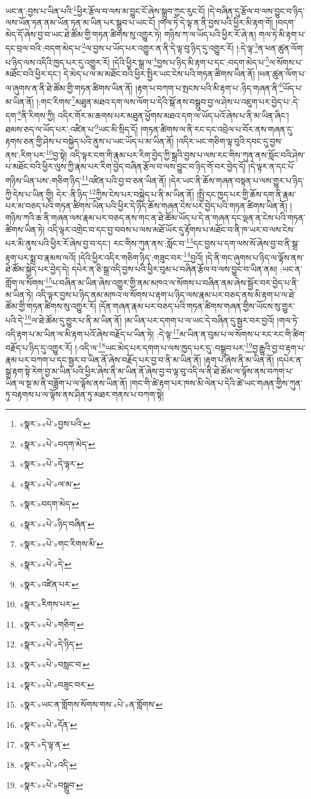 ཡང་ན་:བྱས་པ་ཡིན་པའི་\footnote{«སྣར་»«པེ་»བྱས་པའི་}ཕྱིར་རྩོལ་བ་ལས་མ་བྱུང་ངོ་ཞེས་སྒྲུབ་ཀྱང་རུང་ངོ། །དེ་བཞིན་དུ་རྩོལ་བ་ལས་བྱུང་བ་ཉིད་ལས་ཡོན་ཏན་ནམ་ཡོན་ཏན་མ་ཡིན་པར་སྒྲུབ་པ་ཡང་ངོ། །གལ་ཏེ་དེ་ལྟ་ན་ནི་བྱས་པའི་ཕྱིར་མི་རྟག་གོ། །བདག་མེད་དོ་ཞེས་བྱ་བ་ཡང་ཐེ་ཚོམ་གྱི་གཏན་ཚིགས་སུ་འགྱུར་ཏེ། གཉིས་ཀ་ལ་ཡོད་པའི་ཕྱིར་རོ་ཞེ་ན། གལ་ཏེ་མི་རྟག་པ་དང་བྲལ་བའི་:བདག་མེད་པ་\footnote{«སྣར་»«པེ་»བདག་མེད་}ལ་བྱས་པ་ཡོད་པར་འགྱུར་ན་ནི་དེ་ལྟ་བུ་ཉིད་དུ་འགྱུར་རོ། །:དེ་ལྟ་\footnote{«སྣར་»«པེ་»དེ་ལྟར་}ན་ཕན་ཚུན་ལོག་པ་ཉིད་ལས་འདིའི་ཁྱད་པར་དུ་འགྱུར་རོ། །དེའི་ཕྱིར་སྒྲ་ལ་\footnote{«སྣར་»«པེ་»ལ་མ་}བྱས་པ་ཉིད་མི་རྟག་པ་དང་:བདག་མེད་པ་\footnote{«སྣར་»བདག་མེད་}ལ་སོགས་པ་མཐོང་བའི་ཕྱིར་དང་། དེ་མེད་པ་ལ་མ་མཐོང་བའི་ཕྱིར་སྤྱིར་ཡང་ངེས་པའི་གཏན་ཚིགས་ཡིན་ནོ། །ཕན་ཚུན་ལོག་པ་ལ་ཞུགས་ན་ནི་ཐེ་ཚོམ་གྱི་གཏན་ཚིགས་ཡིན་ནོ། །རྟག་པ་བཀག་པ་སྤངས་པའི་མི་རྟག་པ་:ཉིད་གཞན་ནི་\footnote{«སྣར་»«པེ་»ཉིད་བཞིན་}ཡོད་པ་མ་ཡིན་ནོ། །:གང་རིགས་\footnote{«སྣར་»«པེ་»གང་རིགས་མི་}མཐུན་མཐའ་དག་ལས་ལོག་པ་དེའི་སྒོ་ནས་བསྒྲུབ་བྱ་ལ་ཤེས་པ་འཇུག་པར་བྱེད་པ་:དེ་དག་\footnote{«སྣར་»«པེ་»དེ་}ནི་རིགས་ཀྱི། འདིར་གོར་མ་ཆགས་པར་མཐུན་ཕྱོགས་མཐའ་དག་ལ་ཡོད་པའོ་ཞེས་པ་ནི་མ་ཡིན་ཞིང་། ཐམས་ཅད་ལ་ཡོད་པར་:འཛིན་པ་\footnote{«སྣར་»འཛིན་པར་}ཡང་མི་སྲིད་དོ། །གཏན་ཚིགས་ལ་ནི་རང་དང་འབྲེལ་པ་བོར་ནས་གཞན་དུ་རྟགས་ཅན་གྱི་ཤེས་པ་བསྐྱེད་པའི་ནུས་པ་ཡང་ཡོད་པ་མ་ཡིན་ནོ། །འདིར་ཡང་གཅིག་ལྟ་བུའི་དབང་དུ་བྱས་ནས་:རིག་པར་\footnote{«སྣར་»རིགས་པར་}བྱ་སྟེ། འདི་ལྟར་ངག་གི་རྣམ་པར་རིག་བྱེད་ཀྱི་སྒྲའི་བྱས་པ་ལས་རང་གིས་ཀུན་ནས་སློང་བའི་ཤེས་པ་མཐོང་བའི་ཕྱིར་ལུས་ཀྱི་རྣམ་པར་རིག་བྱེད་བཞིན་རྩོལ་བ་ལས་བྱུང་བ་ཉིད་གོ་བར་བྱེད་དོ། །དེ་ལྟར་ན་དང་པོ་གཉིས་ཡིན་པས་:གཅིག་ཉིད་\footnote{«སྣར་»«པེ་»གཅིག་}འཛིན་པའི་བྱ་བ་ཅན་ཡིན་ནོ། །དེར་ཡང་ནི་ཆོས་གཞན་བསྟན་པ་ལས་གྱུར་པ་ཉིད་ཀྱི་དེས་པ་ཡིན་གྱི། དེར་:ནི་ཉིད་\footnote{«སྣར་»«པེ་»དེ་ཉིད་}ཀྱིས་ངེས་པར་བསྐྱེད་པ་ནི་མ་ཡིན་ནོ། །སྤྱི་དང་ཁྱད་པར་གྱི་ཆོས་དག་ནི་རྣམ་པར་མ་བཅད་པའི་གཏན་ཚིགས་ཡིན་པའི་ཕྱིར་དེ་ཉིད་ཆོས་གཞན་ངེས་པར་བྱེད་པའི་གཏན་ཚིགས་ཡིན་ནོ། །གཉིས་ཀའི་ཆ་ནི་གཞན་ལས་རྣམ་པར་བཅད་ནས་གང་ན་ཐེ་ཚོམ་ཡོད་པ་དེ་ན་གཞན་དང་ལྡན་ན་ངེས་པའི་གཏན་ཚིགས་ཡིན་ཏེ། འདི་ལྟར་འགྲེང་བ་དང་བྱ་བབས་པ་ལས་མཐོ་ཡོར་དུ་རྟོགས་པ་མཐོང་བ་ནི་ཁ་ཡར་བ་ལས་ངེས་པར་མི་ནུས་པའི་ཕྱིར་རོ་ཞེས་བྱ་བ་དང་། རང་གིས་ཀུན་ནས་:སློང་བ་\footnote{«སྣར་»«པེ་»བསླང་བ་}དང་བྱས་པ་དག་ལས་སོ་ཞེས་བྱ་བ་ནི་སྒྲ་རྟག་པར་སྨྲ་བ་རྣམས་ལའོ། །དེའི་ཕྱིར་འདིར་གཅིག་ཉིད་:གཟུང་བར་\footnote{«སྣར་»«པེ་»བཟུང་བར་}བྱའོ། །དེ་ནི་གང་ཞུགས་པ་ཉིད་ལ་ལྟོས་ནས་ཐེ་ཚོམ་སྐྱེད་པར་བྱེད་དེ། དཔེར་ན་ཅི་སྒྲ་འདི་བྱས་པའི་ཕྱིར་བུམ་པ་བཞིན་རྩོལ་བ་ལས་བྱུང་བ་ཡིན་ནམ། :ཡང་ན་གློག་ལ་སོགས་\footnote{«སྣར་»ཡང་ན་གློགས་སོགས་གས་«པེ་»ན་གློགས་}པ་བཞིན་མ་ཡིན་ཞེས་འགྱུར་གྱི་ནམ་མཁའ་ལ་སོགས་པ་བཞིན་ནམ་ཞེས་སྦྱོར་བར་བྱེད་པ་ནི་མ་ཡིན་ཏེ། འདི་ལྟར་བྱས་པ་ཉིད་ནམ་མཁའ་ལ་སོགས་པ་རྟག་པ་ཉིད་ལས་རྣམ་པར་བཅད་ནས་མི་རྟག་པ་ལ་ཐེ་ཚོམ་གྱི་གཏན་ཚིགས་སུ་འགྱུར་རོ། །དོན་གཞན་རྣམ་པར་བཅད་པའི་གཏན་ཚིགས་གཞན་གྱིས་ཡོངས་སུ་གྱུར་པའི་དེ་\footnote{«སྣར་»«པེ་»དོན་}ལ་ཐེ་ཚོམ་དུ་གྱུར་པ་ནི་མ་ཡིན་ནོ། །མ་ཡིན་པར་དགག་པ་ལ་ཡང་དེ་བཞིན་དུ་སྦྱར་བར་བྱའོ། །གལ་ཏེ་འདི་རྟག་པ་མ་ཡིན་ལ་མི་རྟག་པའོ་ཞེས་བརྗོད་པ་ཡིན་ཏེ། :དེ་ལྟ་\footnote{«སྣར་»དེ་ལྟ་ན་}མ་ཡིན་ན་བུམ་པ་ལ་སོགས་པ་རང་རང་གི་ཚིག་བརྗོད་པ་ཉིད་དུ་འགྱུར་རོ། །:འདི་ལ་\footnote{«སྣར་»«པེ་»འདི་}ཡང་མེད་པར་དགག་པ་ལས་ཁྱད་པར་དུ་:བསྒྲུབ་པར་\footnote{«སྣར་»«པེ་»བསྒྲུབ་}བྱ་རྒྱུའི་བྱ་བ་རྟག་པ་རྣམ་པར་བཀག་པ་དང་སྦྱར་བ་ཡིན་ནོ་ཞེས་བརྗོད་པར་བྱ་བ་ནི་མ་ཡིན་ནོ། །རྟག་པ་ཞེས་ནི་མ་ཡིན་ནོ། །དཔེར་ན་སྒྲ་རྟག་སྟེ་རེག་བྱ་མ་ཡིན་པའི་ཕྱིར་ཞེས་ནི་མ་ཡིན་ནོ་ཞེས་བྱ་བ་ལྟ་བུ་འདི་ལ་ནི་ཐེ་ཚོམ་ལ་ལྟོས་ནས་བཀག་པ་ཡིན་ལ་སྔ་མ་ནི་བཟློག་པ་ལ་ལྟོས་ནས་ཡིན་ནོ། །གང་གི་ཚེ་རྟག་པར་ཁས་མི་ལེན་པ་དེའི་ཚེ་ཡང་གཞན་གྱིས་ཀུན་ཏུ་བརྟགས་པ་ལ་ལྟོས་ནས་ཤིན་ཏུ་མཐར་གནས་པ་བཀག་སྟེ། 